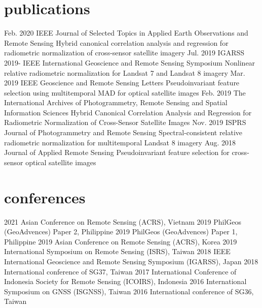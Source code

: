 \documentclass[icon]{mycvtemplate}
\begin{document}
\section {publications}
\begin{TableTemplate}
    \TableTemplateItem
    {Feb. 2020}
    {IEEE Journal of Selected Topics in Applied Earth Observations and Remote Sensing}
    {}
    {Hybrid canonical correlation analysis and regression for radiometric normalization of cross-sensor satellite imagery}
    \TableTemplateItem
    {Jul. 2019}
    {IGARSS 2019- IEEE International Geoscience and Remote Sensing Symposium}
    {}
    {Nonlinear relative radiometric normalization for Landsat 7 and Landsat 8 imagery}
    \TableTemplateItem
    {Mar. 2019}
    {IEEE Geoscience and Remote Sensing Letters}
    {}
    {Pseudoinvariant feature selection using multitemporal MAD for optical satellite images}
    \TableTemplateItem
    {Feb. 2019}
    {The International Archives of Photogrammetry, Remote Sensing and Spatial Information Sciences}
    {}
    {Hybrid Canonical Correlation Analysis and Regression for Radiometric Normalization of Cross-Sensor Satellite Images}
    \TableTemplateItem
    {Nov. 2019}
    {ISPRS Journal of Photogrammetry and Remote Sensing}
    {}
    {Spectral-consistent relative radiometric normalization for multitemporal Landsat 8 imagery}
    \TableTemplateItem
    {Aug. 2018}
    {Journal of Applied Remote Sensing}
    {}
    {Pseudoinvariant feature selection for cross-sensor optical satellite images}
\end{TableTemplate}


\section {conferences}
\begin{twentyshort}
    \twentyitemshort 
    {2021}
    {Asian Conference on Remote Sensing (ACRS), Vietnam}
    \twentyitemshort
    {2019}
    {PhilGeos (GeoAdvences) Paper 2, Philippine}
    \twentyitemshort
    {2019}
    {PhilGeos (GeoAdvences) Paper 1, Philippine}
    \twentyitemshort
    {2019}
    {Asian Conference on Remote Sensing (ACRS), Korea}
    \twentyitemshort
    {2019}
    {International Symposium on Remote Sensing (ISRS), Taiwan}
    \twentyitemshort
    {2018}
    {IEEE International Geoscience and Remote Sensing Symposium (IGARSS), Japan}
    \twentyitemshort
    {2018}
    {International conference of SG37, Taiwan}
    \twentyitemshort
    {2017}
    {International Conference of Indonesia Society for Remote Sensing (ICOIRS), Indonesia}
    \twentyitemshort
    {2016}
    {International Symposium on GNSS (ISGNSS), Taiwan}
    \twentyitemshort
    {2016}
    {International conference of SG36, Taiwan}
\end{twentyshort}
\end{document}
